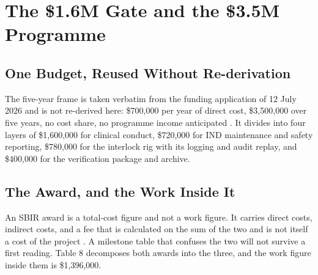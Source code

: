 \section{The \$1.6M Gate and the \$3.5M Programme}

\subsection{One Budget, Reused Without Re-derivation}

The five-year frame is taken verbatim from the funding application of 12 July
2026 and is not re-derived here: \$700,000 per year of direct cost, \$3,500,000
over five years, no cost share, no programme income anticipated
\cite{fundapp2}. It divides into four layers of \$1,600,000 for clinical
conduct, \$720,000 for IND maintenance and safety reporting, \$780,000 for the
interlock rig with its logging and audit replay, and \$400,000 for the
verification package and archive.

\subsection{The Award, and the Work Inside It}

An SBIR award is a total-cost figure and not a work figure. It carries direct
costs, indirect costs, and a fee that is calculated on the sum of the two and is
not itself a cost of the project \cite{nihgpsfee}. A milestone table that
confuses the two will not survive a first reading. Table 8 decomposes both
awards into the three, and the work figure inside them is \$1,396,000.

